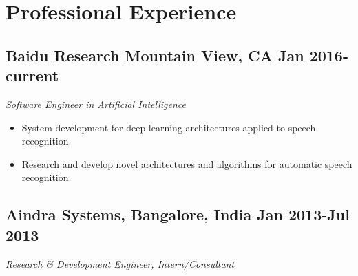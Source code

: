 \documentclass[10pt,letterpaper,sans]{moderncv}        %
\begin{document}
\pagestyle{empty}
\makecvtitle



\section{Professional Experience}

\vspace{2pt}

\subsection{\textbf{Baidu Research} Mountain View, CA \small{Jan 2016-current}}
\textit{Software Engineer in Artificial Intelligence}
\begin{small}
\begin{itemize}
\item System development for deep learning architectures applied to speech recognition.
\item Research and develop novel architectures and algorithms for automatic speech recognition.
\end{itemize}
\end{small}

\subsection{\textbf{Aindra Systems}, Bangalore, India \small{Jan 2013-Jul 2013}}
\textit{Research \& Development Engineer, Intern/Consultant}
\end{document}
